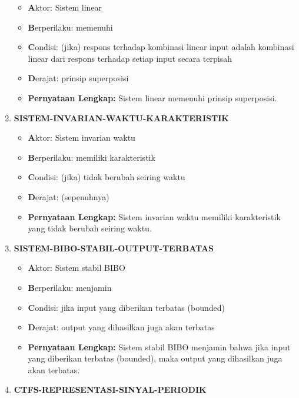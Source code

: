 \documentclass[
  letterpaper,
  DIV=11,
  numbers=noendperiod]{scrreprt}
\begin{document}
\begin{enumerate}
  \begin{itemize}
  \item
    \textbf{A}ktor: Sistem linear
  \item
    \textbf{B}erperilaku: memenuhi
  \item
    \textbf{C}ondisi: (jika) respons terhadap kombinasi linear input
    adalah kombinasi linear dari respons terhadap setiap input secara
    terpisah
  \item
    \textbf{D}erajat: prinsip superposisi
  \item
    \textbf{Pernyataan Lengkap:} Sistem linear memenuhi prinsip
    superposisi.
  \end{itemize}
\item
  \textbf{SISTEM-INVARIAN-WAKTU-KARAKTERISTIK}

  \begin{itemize}
  \item
    \textbf{A}ktor: Sistem invarian waktu
  \item
    \textbf{B}erperilaku: memiliki karakteristik
  \item
    \textbf{C}ondisi: (jika) tidak berubah seiring waktu
  \item
    \textbf{D}erajat: (sepenuhnya)
  \item
    \textbf{Pernyataan Lengkap:} Sistem invarian waktu memiliki
    karakteristik yang tidak berubah seiring waktu.
  \end{itemize}
\item
  \textbf{SISTEM-BIBO-STABIL-OUTPUT-TERBATAS}

  \begin{itemize}
  \item
    \textbf{A}ktor: Sistem stabil BIBO
  \item
    \textbf{B}erperilaku: menjamin
  \item
    \textbf{C}ondisi: jika input yang diberikan terbatas (bounded)
  \item
    \textbf{D}erajat: output yang dihasilkan juga akan terbatas
  \item
    \textbf{Pernyataan Lengkap:} Sistem stabil BIBO menjamin bahwa jika
    input yang diberikan terbatas (bounded), maka output yang dihasilkan
    juga akan terbatas.
  \end{itemize}
\item
  \textbf{CTFS-REPRESENTASI-SINYAL-PERIODIK}


\end{enumerate}
\end{document}
